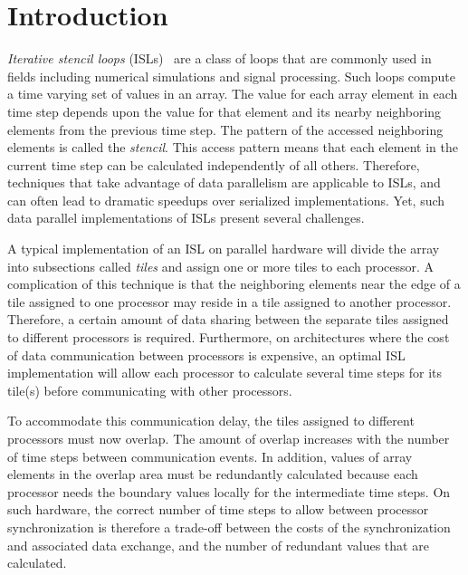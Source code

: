 \documentclass[preprint,nocopyrightspace]{styles/sigplanconf}
\begin{document}

\section{Introduction}

{\em Iterative stencil loops} (ISLs)~\cite{li} are a class of loops that are
commonly used in fields including numerical simulations and signal processing.
Such loops compute a time varying set of values in an array.  The value for
each array element in each time step depends upon the value for that element
and its nearby neighboring elements from the previous time step.  
The pattern of the accessed neighboring elements is called the {\em stencil}.
This access pattern means that each element in the current time step 
can be calculated independently of all others.  
Therefore, techniques that take advantage of data
parallelism are applicable to ISLs, and can often lead to dramatic speedups
over serialized implementations.  Yet, such data parallel implementations of
ISLs present several challenges.

A typical implementation of an ISL on parallel hardware will divide the array
into subsections called {\em tiles} and assign one or more tiles to each
processor.  A complication of this technique is that the neighboring elements
near the edge of a tile assigned to one processor may reside in a
tile assigned to another processor.  Therefore, a certain amount of data
sharing between the separate tiles assigned to different processors is required.
Furthermore, on architectures where the cost of data communication between
processors is expensive, an optimal ISL implementation will allow each
processor to calculate several time steps for its tile(s) before communicating
with other processors.

To accommodate this communication delay, the tiles assigned to different 
processors must now overlap.
The amount of overlap increases with the number of time steps
between communication events.  
In addition, values of array elements in the overlap area must 
be redundantly calculated because each processor needs the boundary values 
locally for the intermediate time steps.
On such hardware, the correct number of time steps to
allow between processor synchronization is therefore a trade-off between the
costs of the synchronization and associated data exchange, and the number of
redundant values that are calculated.  
\end{document}
